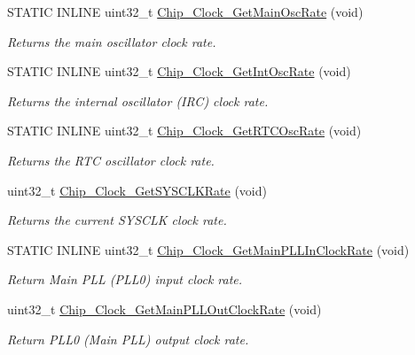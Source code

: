 \begin{DoxyCompactItemize}
S\+T\+A\+T\+I\+C I\+N\+L\+I\+N\+E uint32\+\_\+t \hyperlink{group___c_l_o_c_k__17_x_x__40_x_x_ga32ea9f95eed11d2bfa470b473232456e}{Chip\+\_\+\+Clock\+\_\+\+Get\+Main\+Osc\+Rate} (void)
\begin{DoxyCompactList}\small\item\em Returns the main oscillator clock rate. \end{DoxyCompactList}\item 
S\+T\+A\+T\+I\+C I\+N\+L\+I\+N\+E uint32\+\_\+t \hyperlink{group___c_l_o_c_k__17_x_x__40_x_x_gaa8db0ad49f51bf5d6870181e77249c2b}{Chip\+\_\+\+Clock\+\_\+\+Get\+Int\+Osc\+Rate} (void)
\begin{DoxyCompactList}\small\item\em Returns the internal oscillator (I\+R\+C) clock rate. \end{DoxyCompactList}\item 
S\+T\+A\+T\+I\+C I\+N\+L\+I\+N\+E uint32\+\_\+t \hyperlink{group___c_l_o_c_k__17_x_x__40_x_x_ga64b01351fd2019749b1f1d18dfd263f0}{Chip\+\_\+\+Clock\+\_\+\+Get\+R\+T\+C\+Osc\+Rate} (void)
\begin{DoxyCompactList}\small\item\em Returns the R\+T\+C oscillator clock rate. \end{DoxyCompactList}\item 
uint32\+\_\+t \hyperlink{group___c_l_o_c_k__17_x_x__40_x_x_gaec133465745ce56e49b184185f8252e1}{Chip\+\_\+\+Clock\+\_\+\+Get\+S\+Y\+S\+C\+L\+K\+Rate} (void)
\begin{DoxyCompactList}\small\item\em Returns the current S\+Y\+S\+C\+L\+K clock rate. \end{DoxyCompactList}\item 
S\+T\+A\+T\+I\+C I\+N\+L\+I\+N\+E uint32\+\_\+t \hyperlink{group___c_l_o_c_k__17_x_x__40_x_x_gade97c5e68f4609663e247043b48949d9}{Chip\+\_\+\+Clock\+\_\+\+Get\+Main\+P\+L\+L\+In\+Clock\+Rate} (void)
\begin{DoxyCompactList}\small\item\em Return Main P\+L\+L (P\+L\+L0) input clock rate. \end{DoxyCompactList}\item 
uint32\+\_\+t \hyperlink{group___c_l_o_c_k__17_x_x__40_x_x_gad1a38c10a143b8e21d2a8085ec0cb13e}{Chip\+\_\+\+Clock\+\_\+\+Get\+Main\+P\+L\+L\+Out\+Clock\+Rate} (void)
\begin{DoxyCompactList}\small\item\em Return P\+L\+L0 (Main P\+L\+L) output clock rate. \end{DoxyCompactList}\item 

\end{DoxyCompactItemize}
